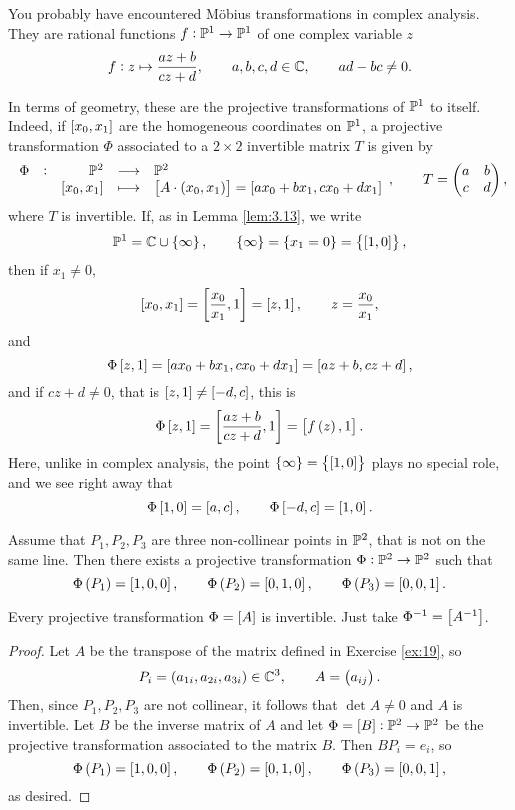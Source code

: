 \begin{example}
\label{eg:8.4}
You probably have encountered M\"obius transformations in complex analysis. They are rational functions $ f : \mathbb{P}^1 \to \mathbb{P}^1 $ of one complex variable $ z $
$$ f : z \mapsto \dfrac{az + b}{cz + d}, \qquad a, b, c, d \in \mathbb{C}, \qquad ad - bc \ne 0. $$

\pagebreak

In terms of geometry, these are the projective transformations of $ \mathbb{P}^1 $ to itself. Indeed, if $ \sbr{x_0, x_1} $ are the homogeneous coordinates on $ \mathbb{P}^1 $, a projective transformation $ \Phi $ associated to a $ 2 \times 2 $ invertible matrix $ T $ is given by
$$ \function[\Phi]{\PP^2}{\PP^2}{\sbr{x_0, x_1}}{\sbr{A \cdot \br{x_0, x_1}} = \sbr{ax_0 + bx_1, cx_0 + dx_1}}, \qquad T = \twobytwo{a}{b}{c}{d}, $$
where $ T $ is invertible. If, as in Lemma \ref{lem:3.13}, we write
$$ \PP^1 = \CC \cup \cbr{\infty}, \qquad \cbr{\infty} = \cbr{x_1 = 0} = \cbr{\sbr{1, 0}}, $$
then if $ x_1 \ne 0 $,
$$ \sbr{x_0, x_1} = \sbr{\dfrac{x_0}{x_1}, 1} = \sbr{z, 1}, \qquad z = \dfrac{x_0}{x_1}, $$
and
$$ \Phi\sbr{z, 1} = \sbr{ax_0 + bx_1, cx_0 + dx_1} = \sbr{az + b, cz + d}, $$
and if $ cz + d \ne 0 $, that is $ \sbr{z, 1} \ne \sbr{-d, c} $, this is
$$ \Phi\sbr{z, 1} = \sbr{\dfrac{az + b}{cz + d}, 1} = \sbr{f\br{z}, 1}. $$
Here, unlike in complex analysis, the point $ \cbr{\infty} = \cbr{\sbr{1, 0}} $ plays no special role, and we see right away that
$$ \Phi\sbr{1, 0} = \sbr{a, c}, \qquad \Phi\sbr{-d, c} = \sbr{1, 0}. $$
\end{example}

\begin{theorem}
\label{thm:8.5}
Assume that $ P_1, P_2, P_3 $ are three non-collinear points in $ \mathbb{P}^2 $, that is not on the same line. Then there exists a projective transformation $ \Phi : \mathbb{P}^2 \to \mathbb{P}^2 $ such that
$$ \Phi\br{P_1} = \sbr{1, 0, 0}, \qquad \Phi\br{P_2} = \sbr{0, 1, 0}, \qquad \Phi\br{P_3} = \sbr{0, 0, 1}. $$
\end{theorem}

\begin{remark*}
Every projective transformation $ \Phi = \sbr{A} $ is invertible. Just take $ \Phi^{-1} = \sbr{A^{-1}} $.
\end{remark*}

\begin{proof}
Let $ A $ be the transpose of the matrix defined in Exercise \ref{ex:19}, so
$$ P_i = \br{a_{1i}, a_{2i}, a_{3i}} \in \CC^3, \qquad A = \br{a_{ij}}. $$
Then, since $ P_1, P_2, P_3 $ are not collinear, it follows that $ \det A \ne 0 $ and $ A $ is invertible. Let $ B $ be the inverse matrix of $ A $ and let $ \Phi = \sbr{B} : \PP^2 \to \PP^2 $ be the projective transformation associated to the matrix $ B $. Then $ BP_i = e_i $, so
$$ \Phi\br{P_1} = \sbr{1, 0, 0}, \qquad \Phi\br{P_2} = \sbr{0, 1, 0}, \qquad \Phi\br{P_3} = \sbr{0, 0, 1}, $$
as desired.
\end{proof}

